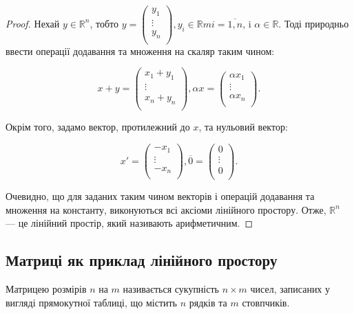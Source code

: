 \begin{proof}
	Нехай $y \in \mathbb{R}^n$, тобто $y = \begin{pmatrix}
		y_1  \\
		\vdots  \\
		y_n  \\
	\end{pmatrix}, y_i \in \mathbb{R}m i = \overline{1, n}$, i $\alpha \in \mathbb{R}$. Тоді
	природньо ввести операції додавання та множення на скаляр таким чином:
		
	 $$x + y = \begin{pmatrix}
		x_1 + y_1  \\
		\vdots  \\
		x_n + y_n  \\
	\end{pmatrix}, \alpha x = \begin{pmatrix}
		\alpha x_1  \\
		\vdots  \\
		\alpha x_n  \\
	\end{pmatrix}.$$
	
	Окрім того, задамо вектор, протилежний до $x$, та нульовий вектор:
	
	$$x' =\begin{pmatrix}
		-x_1  \\
		\vdots  \\
		-x_n  \\
	\end{pmatrix}, \overline{0} = \begin{pmatrix}
		0  \\
		\vdots  \\
		0  \\
	\end{pmatrix}.$$

	Очевидно, що для заданих таким чином векторів і операцій додавання та
	множення на константу, виконуються всі аксіоми лінійного простору. Отже, $\mathbb{R}^n$ ---
	це лінійний простір, який називають арифметичним. 
\end{proof}

\subsection{Матриці як приклад лінійного простору}

\begin{definition}[Матриця]
	Матрицею розмірів $n$ на $m$ називається сукупність $n \times m$ чисел,
	записаних у вигляді прямокутної таблиці, що містить $n$ рядків та $m$ стовпчиків.
\end{definition}

